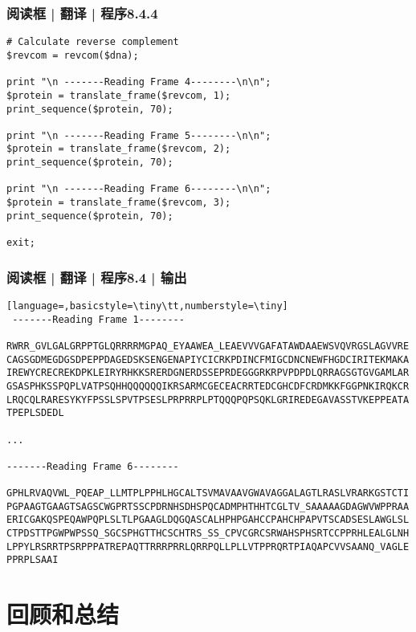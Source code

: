 \begin{frame}[fragile]
  \frametitle{阅读框 | 翻译 | 程序8.4.4}
\begin{lstlisting}[firstnumber=34,basicstyle=\footnotesize\tt,numberstyle=\scriptsize]
# Calculate reverse complement
$revcom = revcom($dna);

print "\n -------Reading Frame 4--------\n\n";
$protein = translate_frame($revcom, 1);
print_sequence($protein, 70);

print "\n -------Reading Frame 5--------\n\n";
$protein = translate_frame($revcom, 2);
print_sequence($protein, 70);

print "\n -------Reading Frame 6--------\n\n";
$protein = translate_frame($revcom, 3);
print_sequence($protein, 70);

exit;
\end{lstlisting}
\end{frame}

\begin{frame}[fragile]
  \frametitle{阅读框 | 翻译 | 程序8.4 | 输出}
\begin{lstlisting}[language=,basicstyle=\tiny\tt,numberstyle=\tiny]
 -------Reading Frame 1--------

RWRR_GVLGALGRPPTGLQRRRRMGPAQ_EYAAWEA_LEAEVVVGAFATAWDAAEWSVQVRGSLAGVVRE
CAGSGDMEGDGSDPEPPDAGEDSKSENGENAPIYCICRKPDINCFMIGCDNCNEWFHGDCIRITEKMAKA
IREWYCRECREKDPKLEIRYRHKKSRERDGNERDSSEPRDEGGGRKRPVPDPDLQRRAGSGTGVGAMLAR
GSASPHKSSPQPLVATPSQHHQQQQQQIKRSARMCGECEACRRTEDCGHCDFCRDMKKFGGPNKIRQKCR
LRQCQLRARESYKYFPSSLSPVTPSESLPRPRRPLPTQQQPQPSQKLGRIREDEGAVASSTVKEPPEATA
TPEPLSDEDL

...

-------Reading Frame 6--------

GPHLRVAQVWL_PQEAP_LLMTPLPPHLHGCALTSVMAVAAVGWAVAGGALAGTLRASLVRARKGSTCTI
PGPAAGTGAAGTSAGSCWGPRTSSCPDRNHSDHSPQCADMPHTHHTCGLTV_SAAAAAGDAGWVWPPRAA
ERICGAKQSPEQAWPQPLSLTLPGAAGLDQGQASCALHPHPGAHCCPAHCHPAPVTSCADSESLAWGLSL
CTPDSTTPGWPWPSSQ_SGCSPHGTTHCSCHTRS_SS_CPVCGRCSRWAHSPHSRTCCPPRHLEALGLNH
LPPYLRSRRTPSRPPPATREPAQTTRRRPRRLQRRPQLLPLLVTPPRQRTPIAQAPCVVSAANQ_VAGLE
PPRPLSAAI
\end{lstlisting}
\end{frame}

\section{回顾和总结}
